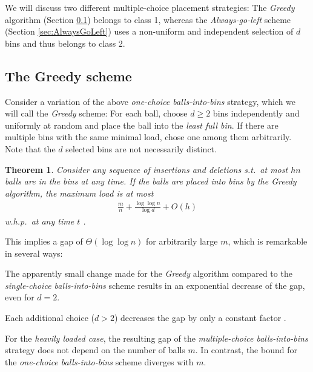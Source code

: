 \documentclass[a4paper,12pt]{article}
\newcommand\todo[1]{\textcolor{red}{(TODO: #1)}}
\newtheorem{theorem}{Theorem}
\begin{document}
We will discuss two different multiple-choice placement strategies: The \emph{Greedy} algorithm (Section \ref{sec:greedy}) belongs to class 1, whereas the \emph{Always-go-left} scheme (Section \ref{sec:AlwaysGoLeft}) uses a non-uniform and independent selection of $d$ bins and thus belongs to class 2.

\subsection{The Greedy scheme}
\label{sec:greedy}

Consider a variation of the above \emph{one-choice balls-into-bins} strategy, which we will call the \emph{Greedy} scheme: For each ball, choose $d \geq 2$ bins independently and uniformly at random and place the ball into the \emph{least full bin}. If there are multiple bins with the same minimal load, chose one among them arbitrarily. Note that the $d$ selected bins are not necessarily distinct. 

\begin{theorem}
\label{theorem:greedy}
Consider any sequence of insertions and deletions s.t.~at most $hn$ balls are in the bins at any time. If the balls are placed into bins by the Greedy algorithm, the maximum load is at most 
\begin{align*}
\frac{m}{n} + \frac{\log \log n}{\log d}+ O(h)
\end{align*}
w.h.p.~at any time $t$ \cite{ABKU99} \cite{BCSV06}.
\end{theorem}

This implies a gap of $\Theta\left(\log \log n \right)$ for arbitrarily large $m$, which is remarkable in several ways:
\begin{compactitem}
\item The apparently small change made for the \emph{Greedy} algorithm compared to the \emph{single-choice balls-into-bins} scheme results in an exponential decrease of the gap, even for $d=2$. 
\item Each additional choice ($d > 2$) decreases the gap by only a constant factor \cite{MRS01}. 
\item For the \emph{heavily loaded case}, the resulting gap of the \emph{multiple-choice balls-into-bins} strategy does not depend on the number of balls $m$. In contrast, the bound for the \emph{one-choice balls-into-bins} scheme diverges with $m$.
\begin{comment}
\todo{the following is only true for class 1 algorithms}
\item The given bounds are \emph{tight}, meaning that no other strategy that places each ball into one of $d$ randomly selected bins achieves a gap that is asymptotically lower.
\end{comment}
\end{compactitem}
\end{document}
